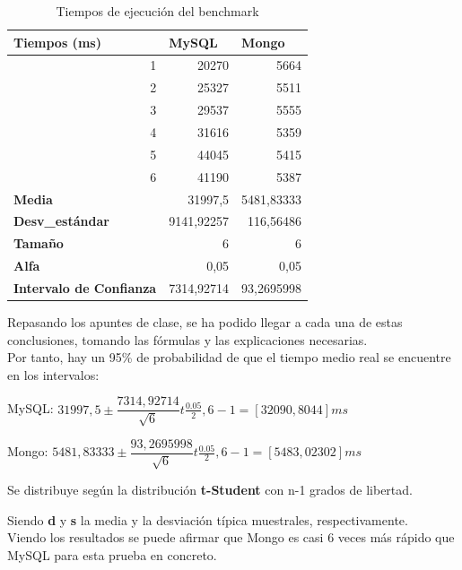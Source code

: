 \begin{table}[H]
	\centering
	\begin{tabular}{lrr}
		\textbf{Tiempos (ms)} & \multicolumn{1}{l}{\textbf{MySQL}} & \multicolumn{1}{l}{\textbf{Mongo}} \\
		\hline
		\multicolumn{1}{r}{1} & 20270 & 5664 \\
		\multicolumn{1}{r}{2} & 25327 & 5511 \\
		\multicolumn{1}{r}{3} & 29537 & 5555 \\
		\multicolumn{1}{r}{4} & 31616 & 5359 \\
		\multicolumn{1}{r}{5} & 44045 & 5415 \\
		\multicolumn{1}{r}{6} & 41190 & 5387 \\
		\hline
		\textbf{Media} & 31997,5 & 5481,83333 \\
		\textbf{Desv\_estándar} & 9141,92257 & 116,56486 \\
		\textbf{Tamaño} & 6     & 6 \\
		\textbf{Alfa} & 0,05  & 0,05 \\
		\textbf{Intervalo de Confianza} & 7314,92714 & 93,2695998 \\
	\end{tabular}%
	\caption{Tiempos de ejecución del benchmark}
	\label{tab:tiempos}%
\end{table}%

Repasando los apuntes de clase, se ha podido llegar a cada una de estas conclusiones, tomando las fórmulas y las explicaciones necesarias.\\

Por tanto, hay un 95\% de probabilidad de que el tiempo medio real se encuentre en los intervalos:

\begin{center}
	MySQL: $ 31997,5 \pm \dfrac{7314,92714}{\sqrt{6}}t \frac{0.05}{2},6-1 = [32090,8044]ms$

Mongo: $ 5481,83333 \pm \dfrac{93,2695998}{\sqrt{6}}t \frac{0.05}{2},6-1 = [5483,02302]ms$
\end{center}
Se distribuye según la distribución \textbf{t-Student} con n-1 grados de libertad. 

Siendo \textbf{d} y \textbf{s} la media y la desviación típica muestrales, respectivamente.\\

Viendo los resultados se puede afirmar que Mongo es casi 6 veces más rápido que MySQL para esta prueba en concreto.

\newpage





